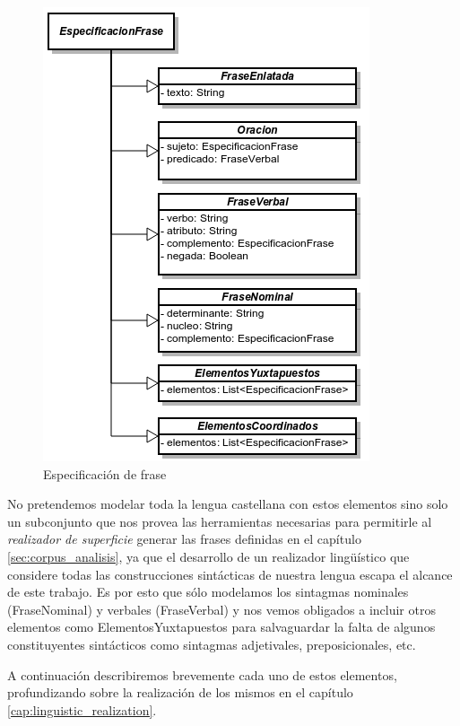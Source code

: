 \begin{figure}[h]
  	\centering
	\includegraphics[scale=0.7]{img/phrase_spec.png}
	\caption{Especificación de frase}
  	\label{fig:phase_spec}
\end{figure}

No pretendemos modelar toda la lengua castellana con estos elementos sino solo un subconjunto que nos provea las herramientas necesarias para permitirle al \emph{realizador de superficie} generar las frases definidas en el capítulo \ref{sec:corpus_analisis}, ya que el desarrollo de un realizador lingüístico que considere todas las construcciones sintácticas de nuestra lengua escapa el alcance de este trabajo. Es por esto que sólo modelamos los sintagmas nominales (FraseNominal) y verbales (FraseVerbal) y nos vemos obligados a incluir otros elementos como ElementosYuxtapuestos para salvaguardar la falta de algunos constituyentes sintácticos como sintagmas adjetivales, preposicionales, etc. 

A continuación describiremos brevemente cada uno de estos elementos, profundizando sobre la realización de los mismos en el capítulo \ref{cap:linguistic_realization}.



